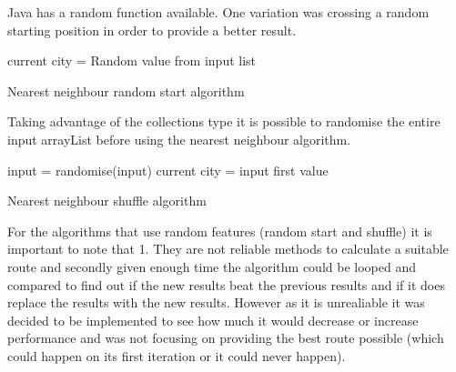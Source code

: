 \documentclass[conference,backref=page]{acmsiggraph}
\begin{document}
Java has a random function available. One variation was crossing a random starting position in order to provide a better result. 


	\begin{algorithm}[h]	
		current city = Random value from input list\\
		\caption{Nearest neighbour random start algorithm}
	\end{algorithm}	
Taking advantage of the collections type it is possible to 	randomise the entire input arrayList before using the nearest neighbour algorithm.
		

\begin{algorithm}[h]	
	input = randomise(input)
	current city = input first value\\
	\caption{Nearest neighbour shuffle algorithm}
\end{algorithm}

For the algorithms that use random features (random start and shuffle) it is important to note that 1. They are not reliable methods to calculate a suitable route and secondly given enough time the algorithm could be looped and compared to find out if the new results beat the previous results and if it does replace the results with the new results. However as it is unrealiable it was decided to be implemented to see how much it would decrease or increase performance and was not focusing on providing the best route possible (which could happen on its first iteration or it could never happen). 
\end{document}
